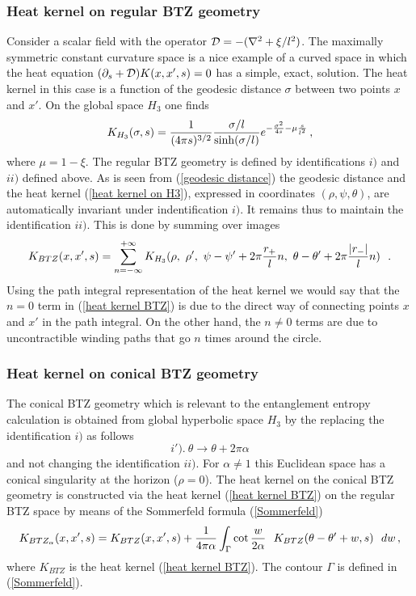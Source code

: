 \documentclass[12pt]{article}
\begin{document}
\subsubsection{Heat kernel on regular BTZ geometry}
Consider a scalar field with the operator ${\cal D}=-(\nabla^2+\xi/l^2)$. The maximally symmetric constant curvature space is a nice example of a curved space in which  the heat equation 
$(\partial_s+{\cal D})K(x,x',s)=0$ has a simple, exact, solution. The heat kernel in this case is a function of the geodesic distance $\sigma$ between two points $x$ and $x'$.
On the global space $H_3$ one finds                       
\begin{equation}
K_{H_3}(\sigma , s)={1\over (4\pi s)^{3/2}}{\sigma /l \over \sinh (\sigma / l)}
e^{-{\sigma^2\over 4s}-\mu{s\over l^2}}\, ,
\label{heat kernel on H3}
\end{equation}
where $\mu=1-\xi$. The regular BTZ  geometry is defined by identifications $i)$ and $ii)$ defined above. As is seen from (\ref{geodesic distance}) the geodesic distance and  the heat kernel (\ref{heat kernel on H3}), expressed   in coordinates $(\rho,\psi,\theta)$, are automatically invariant under indentification $i)$.   It remains thus to maintain the identification $ii)$. This is done
by summing over images 
\begin{equation}
K_{BTZ}(x,x',s)=\sum_{n=-\infty}^{+\infty} K_{H_3}(\rho ,~ \rho ',~
\psi-\psi '+2\pi{r_+\over l}n,~\theta-\theta '+2\pi{|r_-|\over l}n)~~.
\label{heat kernel BTZ}
\end{equation}
 Using the path integral representation of the heat kernel we would say that
the $n=0$ term in (\ref{heat kernel BTZ}) is due to the direct way of connecting
points $x$ and $x'$ in the path integral. On the other hand, 
the $n\neq 0$ terms are due to uncontractible winding paths that 
go $n$ times around the circle.                            
                             
 
 
\subsubsection{Heat kernel on conical BTZ geometry }

The conical BTZ geometry which is relevant to the entanglement entropy calculation   is obtained from global hyperbolic space $H_3$    by the replacing the identification
$i)$ as   follows
$$
i'). \ \theta\rightarrow \theta +2\pi\alpha
$$
and not changing the identification $ii).$  For $\alpha \neq 1$ this Euclidean space   has a conical singularity at the horizon ($\rho=0$).
The heat kernel on the conical BTZ geometry is constructed via the heat kernel  (\ref{heat kernel BTZ})
on the regular BTZ space by means of the Sommerfeld formula (\ref{Sommerfeld})
\begin{equation}
K_{BTZ_{\alpha}}(x,x',s)=K_{BTZ}(x,x',s)+{1\over 4\pi\alpha}
\int_{\Gamma}\cot {w\over 2\alpha}~~K_{BTZ}(\theta-\theta '+w,s)~~dw\, ,
\label{heat kernel conical BTZ}
\end{equation}
where $K_{BTZ}$ is the heat kernel (\ref{heat kernel BTZ}). 
The contour $\Gamma$ is defined in (\ref{Sommerfeld}).
\end{document}
